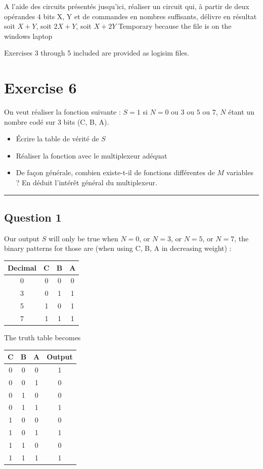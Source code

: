 \documentclass[a4paper,10pt]{article}
\def\centralruler{\begin{center}\rule{5cm}{.1pt}\end{center}}
\begin{document}
A l'aide des circuits présentés jusqu'ici, réaliser un circuit qui, à partir de deux opérandes $4$ bits X, Y et de commandes en nombres suffisants, délivre en résultat soit $X+Y$, soit $2X+Y$, soit $X+2Y$
Temporary because the file is on the windows laptop

Exercises 3 through 5 included are provided as logisim files.

\section{Exercise 6}

On veut réaliser la fonction suivante : $S=1$ si $N=0$ ou $3$ ou $5$ ou $7$, $N$ étant un nombre codé sur 3 bits (C, B, A).
\begin{itemize}
	\item Écrire la table de vérité de $S$
	\item Réaliser la fonction avec le multiplexeur adéquat
	\item De façon générale, combien existe-t-il de fonctions différentes de $M$ variables ? En déduit l'intérêt général du multiplexeur.
\end{itemize}

\centralruler

\subsection{Question 1}

Our output $S$ will only be true when $N=0$, or $N=3$, or $N=5$, or $N=7$, the binary patterns for those are (when using C, B, A in decreasing weight) :
\begin{center}
	\begin{tabular}{|c|c|c|c|}
		\hline
		Decimal&C&B&A\\\hline
		0&0&0&0\\\hline
		3&0&1&1\\\hline
		5&1&0&1\\\hline
		7&1&1&1\\\hline
	\end{tabular}
\end{center}

The truth table becomes
\begin{center}
	\begin{tabular}{|c|c|c|c|}
		\hline
		C&B&A&Output\\\hline
		0&0&0&1\\\hline
		0&0&1&0\\\hline
		0&1&0&0\\\hline
		0&1&1&1\\\hline
		1&0&0&0\\\hline
		1&0&1&1\\\hline
		1&1&0&0\\\hline
		1&1&1&1\\\hline
	\end{tabular}
\end{center}
\end{document}
